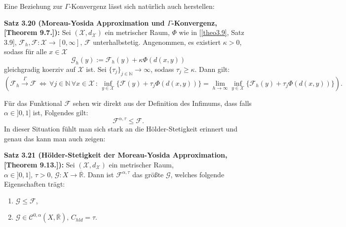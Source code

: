 Eine Beziehung zur \(\Gamma\)-Konvergenz lässt sich natürlich auch herstellen:\\[0.5cm]
\colorbox{generalYellow}{\begin{minipage}{16cm}{\textcolor{black}{}{\label{theo3.20}}}
\textbf{Satz 3.20 (Moreau-Yosida Approximation und \(\Gamma\)-Konvergenz, \cite{MasoGamma}[Theorem 9.7.]):} Sei \((\mathcal{X},d_{\mathcal{X}})\) ein metrischer Raum, \(\Phi\) wie in [\ref{theo3.9}, Satz 3.9], \(\mathcal{F}_h, \mathcal{F} : \mathcal{X} \to [0,\infty], \, \mathcal{F}\) unterhalbstetig. Angenommen, es existiert \(\kappa > 0\), sodass für alle \(x \in \mathcal{X}\)
\begin{equation}
    \mathcal{G}_h(y) := \mathcal{F}_h(y) + \kappa \Phi(d(x,y))
\end{equation}
gleichgradig koerziv auf \(\mathcal{X}\) ist. Sei \(\{\tau_j\}_{j \in \mathbb{N}} \to \infty\), sodass \(\tau_j \geq \kappa\). Dann gilt:
\begin{equation}
    (\mathcal{F}_h \stackrel{\Gamma}{\to} \mathcal{F} \, \Leftrightarrow \, \forall j \in \mathbb{N} \, \forall x \in \mathcal{X} \, : \, \inf_{y \in \mathcal{X}} \{\mathcal{F}(y) + \tau_j \Phi(d(x,y))\} = \lim_{h \to \infty} \inf_{y \in \mathcal{X}} \{\mathcal{F}_h(y) + \tau_j \Phi(d(x,y))\}).
\end{equation}
\end{minipage}}
Für das Funktional \(\mathcal{F}\) sehen wir direkt aus der Definition des Infimums, dass falls \(\alpha \in ]0,1]\) ist, Folgendes gilt:
\begin{equation}
    \mathcal{F}^{\alpha, \tau} \leq \mathcal{F}.
\end{equation}
In dieser Situation fühlt man sich stark an die Hölder-Stetigkeit erinnert und genau das kann man auch zeigen:\\[0.5cm]
\colorbox{generalYellow}{\begin{minipage}{16cm}{\textcolor{black}{}{\label{theo3.21}}}
\textbf{Satz 3.21 (Hölder-Stetigkeit der Moreau-Yosida Approximation, \cite{MasoGamma}[Theorem 9.13.]):} Sei \((\mathcal{X},d_{\mathcal{X}})\) ein metrischer Raum, \(\alpha \in ]0,1], \, \tau > 0, \, \mathcal{G} : X \to \overline{\mathbb{R}}\). Dann ist \(\mathcal{F}^{\alpha, \tau}\) das größte \(\mathcal{G}\), welches folgende Eigenschaften trägt:
\begin{enumerate}
    \item \(\mathcal{G} \leq \mathcal{F}\),
    \item \(\mathcal{G} \in \mathcal{C}^{0,\alpha}(X,\overline{\mathbb{R}}), \, C_{hld} = \tau\).
\end{enumerate}
\end{minipage}}


